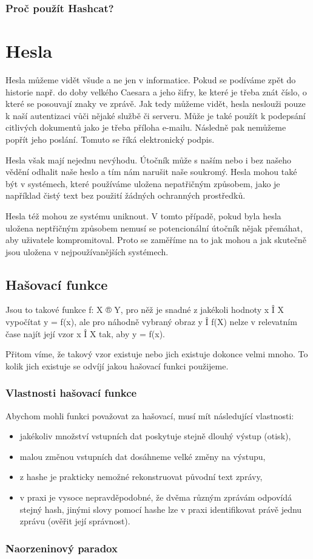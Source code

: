 
\subsection{Proč použít Hashcat?}

\chapter{Hesla}

Hesla můžeme vidět všude a ne jen v informatice. 
Pokud se podíváme zpět do historie např. do doby velkého Caesara a jeho šifry, ke které je třeba znát číslo, o které se posouvají znaky ve zprávě. 
Jak tedy můžeme vidět, hesla neslouži pouze k naší autentizaci vůči nějaké službě či serveru. 
Může je také použít k podepsání citlivých dokumentů jako je třeba příloha e-mailu. 
Následně pak nemůžeme popřít jeho poslání. Tomuto se říká elektronický podpis. 

Hesla však mají nejednu nevýhodu. Útočník může s naším nebo i bez našeho vědění odhalit naše heslo a tím nám narušit naše soukromý. Hesla mohou také být v systémech, které používáme uložena nepatřičným způsobem, jako je například čistý text bez použití žádných ochranných prostředků. 

Hesla též mohou ze systému uniknout. V tomto případě, pokud byla hesla uložena neptřičným způsobem nemusí se potencionální útočník nějak přemáhat, aby uživatele kompromitoval. Proto se zaměříme na to jak mohou a jak skutečně jsou uložena v nejpoužívanějších systémech. 

\section{Hašovací funkce}

Jsou to takové funkce f: X ® Y, pro něž je snadné z jakékoli hodnoty x Î X vypočítat y = f(x), ale pro náhodně vybraný obraz y Î f(X) nelze v relevatním čase najít její vzor x Î X tak, aby y = f(x).

Přitom víme, že takový vzor existuje nebo jich existuje dokonce velmi mnoho. To kolik jich existuje se odvíjí jakou hašovací funkci použijeme.

\subsection{Vlastnosti hašovací funkce}

Abychom mohli funkci považovat za hašovací, musí mít následující vlastnosti:

\begin{itemize}
    \item jakékoliv množství vstupních dat poskytuje stejně dlouhý výstup (otisk),
    \item malou změnou vstupních dat dosáhneme velké změny na výstupu,
    \item z hashe je prakticky nemožné rekonstruovat původní text zprávy,
    \item v praxi je vysoce nepravděpodobné, že dvěma různým zprávám odpovídá stejný hash, jinými slovy pomocí hashe lze v praxi identifikovat právě jednu zprávu (ověřit její správnost).
\end{itemize}


\subsection{Naorzeninový paradox}


